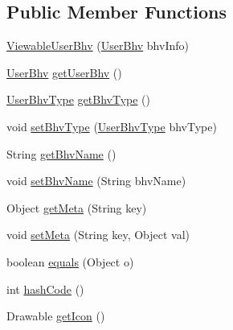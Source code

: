 \subsection*{\-Public \-Member \-Functions}
\begin{DoxyCompactItemize}
\item 
\hyperlink{classlab_1_1davidahn_1_1appshuttle_1_1view_1_1_viewable_user_bhv_a5dd31010cbd7df729af1bd1f7dac83ee}{\-Viewable\-User\-Bhv} (\hyperlink{interfacelab_1_1davidahn_1_1appshuttle_1_1collect_1_1bhv_1_1_user_bhv}{\-User\-Bhv} bhv\-Info)
\item 
\hyperlink{interfacelab_1_1davidahn_1_1appshuttle_1_1collect_1_1bhv_1_1_user_bhv}{\-User\-Bhv} \hyperlink{classlab_1_1davidahn_1_1appshuttle_1_1view_1_1_viewable_user_bhv_ad122739b90e2eaeee1c74ce99cd0e9d7}{get\-User\-Bhv} ()
\item 
\hyperlink{enumlab_1_1davidahn_1_1appshuttle_1_1collect_1_1bhv_1_1_user_bhv_type}{\-User\-Bhv\-Type} \hyperlink{classlab_1_1davidahn_1_1appshuttle_1_1view_1_1_viewable_user_bhv_a3a584c304446a7f9e856f18222aa9a90}{get\-Bhv\-Type} ()
\item 
void \hyperlink{classlab_1_1davidahn_1_1appshuttle_1_1view_1_1_viewable_user_bhv_a0dc5650ebc0efa186e5670661d7ca661}{set\-Bhv\-Type} (\hyperlink{enumlab_1_1davidahn_1_1appshuttle_1_1collect_1_1bhv_1_1_user_bhv_type}{\-User\-Bhv\-Type} bhv\-Type)
\item 
\-String \hyperlink{classlab_1_1davidahn_1_1appshuttle_1_1view_1_1_viewable_user_bhv_a956879b6b47ea49ee3f9a12f5fdd55db}{get\-Bhv\-Name} ()
\item 
void \hyperlink{classlab_1_1davidahn_1_1appshuttle_1_1view_1_1_viewable_user_bhv_a065cfc17964fe1140cd103e02d114f43}{set\-Bhv\-Name} (\-String bhv\-Name)
\item 
\-Object \hyperlink{classlab_1_1davidahn_1_1appshuttle_1_1view_1_1_viewable_user_bhv_a7efcd4e94259a21b0831b7eaeeee533a}{get\-Meta} (\-String key)
\item 
void \hyperlink{classlab_1_1davidahn_1_1appshuttle_1_1view_1_1_viewable_user_bhv_a4a943e168a46e85e75b1aeb25b00d4b9}{set\-Meta} (\-String key, \-Object val)
\item 
boolean \hyperlink{classlab_1_1davidahn_1_1appshuttle_1_1view_1_1_viewable_user_bhv_ac8f036c01d509e95ca35c6376f6295df}{equals} (\-Object o)
\item 
int \hyperlink{classlab_1_1davidahn_1_1appshuttle_1_1view_1_1_viewable_user_bhv_a6c557df7f08844c9635e6b1132158d39}{hash\-Code} ()
\item 
\-Drawable \hyperlink{classlab_1_1davidahn_1_1appshuttle_1_1view_1_1_viewable_user_bhv_a546173d75921d11397a23270712cc56c}{get\-Icon} ()

\end{DoxyCompactItemize}
